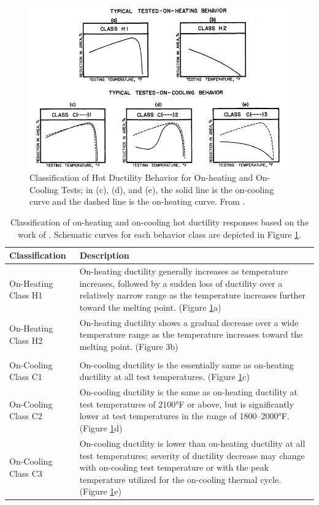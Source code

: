 \begin{figure}[h]
\centering
\includegraphics[width=6in]{figures/nippes-criteria.png}
\caption{Classification of Hot Ductility Behavior for On-heating and On-Cooling Tests; in (c), (d), and (e), the solid line is the on-cooling curve and the dashed line is the on-heating curve.  From \citet[Fig.~66]{nippes_further_1957}.}
\label{fig:nippes-criteria}
\end{figure}

\begin{table}[h]
\caption{Classification of on-heating and on-cooling hot ductility responses based on the work of \citet{nippes_further_1957}. Schematic curves for each behavior class are depicted in Figure \ref{fig:nippes-criteria}.}
\begin{tabular}{ lp{4in} }
\toprule
\textbf{Classification} & \textbf{Description} \\
\midrule
On-Heating Class H1 & On-heating ductility generally increases as temperature increases, followed by a sudden loss of ductility over a relatively narrow range as the temperature increases further toward the melting point. (Figure \ref{fig:nippes-criteria}a) \\
On-Heating Class H2 & On-heating ductility shows a gradual decrease over a wide temperature range as the temperature increases toward the melting point. (Figure 3b) \\
& \\
On-Cooling Class C1 & On-cooling ductility is the essentially same as on-heating ductility at all test temperatures. (Figure \ref{fig:nippes-criteria}c) \\
On-Cooling Class C2 & On-cooling ductility is the same as on-heating ductility at test temperatures of 2100°F or above, but is significantly lower at test temperatures in the range of 1800--2000°F. (Figure \ref{fig:nippes-criteria}d) \\
On-Cooling Class C3 & On-cooling ductility is lower than on-heating ductility at all test temperatures; severity of ductility decrease may change with on-cooling test temperature or with the peak temperature utilized for the on-cooling thermal cycle. (Figure \ref{fig:nippes-criteria}e) \\
\bottomrule
\end{tabular}
\label{tab:nippes-classification}
\end{table}


